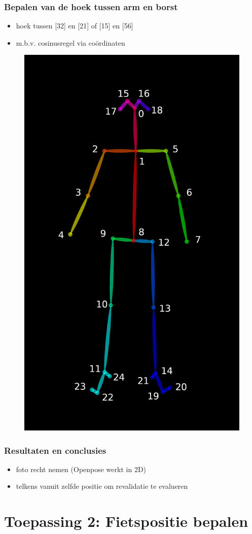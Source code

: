 \documentclass
   [kulak] %
   {kulakbeamer}
\begin{document}
\begin{frame}
\frametitle{Bepalen van de hoek tussen arm en borst}
\begin{itemize}
	\item hoek tussen [32] en [21] of [15] en [56]
	\item m.b.v. cosinusregel via coördinaten
\end{itemize}
\begin{figure}
	\centering
	\includegraphics[width= .3\textwidth]{HPE_skelet}
\end{figure}
\end{frame}

\begin{frame}
\frametitle{Resultaten en conclusies}
\begin{itemize}
	\item foto recht nemen (Openpose werkt in 2D)
	\item telkens vanuit zelfde positie om revalidatie te evalueren
\end{itemize}
\end{frame}



\section{Toepassing 2: Fietspositie bepalen}
\end{document}
